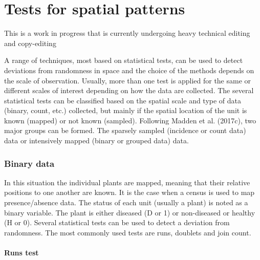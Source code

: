 \documentclass[
  letterpaper,
  DIV=11,
  numbers=noendperiod]{scrreprt}
\begin{document}
\hypertarget{tests-for-spatial-patterns}{%
\chapter{Tests for spatial patterns}\label{tests-for-spatial-patterns}}

\begin{tcolorbox}[enhanced jigsaw, rightrule=.15mm, left=2mm, breakable, colframe=quarto-callout-note-color-frame, toprule=.15mm, leftrule=.75mm, bottomrule=.15mm, colback=white, arc=.35mm, opacityback=0]
\begin{minipage}[t]{5.5mm}
\textcolor{quarto-callout-note-color}{\faInfo}
\end{minipage}%
\begin{minipage}[t]{\textwidth - 5.5mm}
This is a work in progress that is currently undergoing heavy technical
editing and copy-editing\end{minipage}%
\end{tcolorbox}

A range of techniques, most based on statistical tests, can be used to
detect deviations from randomness in space and the choice of the methods
depends on the scale of observation. Usually, more than one test is
applied for the same or different scales of interest depending on how
the data are collected. The several statistical tests can be classified
based on the spatial scale and type of data (binary, count, etc.)
collected, but mainly if the spatial location of the unit is known
(mapped) or not known (sampled). Following Madden et al. (2017c), two
major groups can be formed. The sparsely sampled (incidence or count
data) data or intensively mapped (binary or grouped data) data.

\hypertarget{binary-data}{%
\subsection{Binary data}\label{binary-data}}

In this situation the individual plants are mapped, meaning that their
relative positions to one another are known. It is the case when a
census is used to map presence/absence data. The status of each unit
(usually a plant) is noted as a binary variable. The plant is either
diseased (D or 1) or non-diseased or healthy (H or 0). Several
statistical tests can be used to detect a deviation from randomness. The
most commonly used tests are runs, doublets and join count.

\hypertarget{runs-test}{%
\subsubsection{Runs test}\label{runs-test}}
\end{document}
